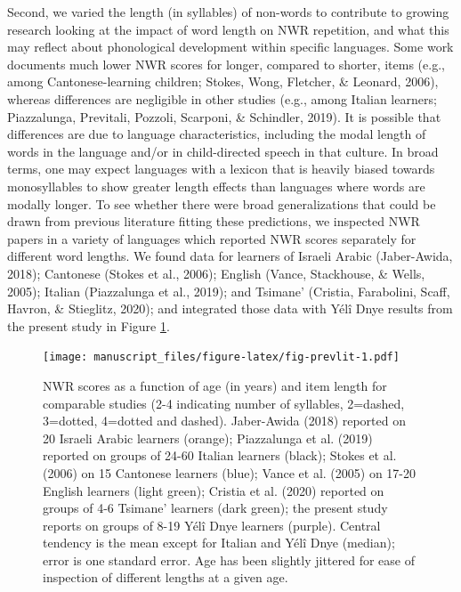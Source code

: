 \documentclass[english,,man,floatsintext]{apa6}
\begin{document}
Second, we varied the length (in syllables) of non-words to contribute to growing research looking at the impact of word length on NWR repetition, and what this may reflect about phonological development within specific languages. Some work documents much lower NWR scores for longer, compared to shorter, items (e.g., among Cantonese-learning children; Stokes, Wong, Fletcher, \& Leonard, 2006), whereas differences are negligible in other studies (e.g., among Italian learners; Piazzalunga, Previtali, Pozzoli, Scarponi, \& Schindler, 2019). It is possible that differences are due to language characteristics, including the modal length of words in the language and/or in child-directed speech in that culture. In broad terms, one may expect languages with a lexicon that is heavily biased towards monosyllables to show greater length effects than languages where words are modally longer. To see whether there were broad generalizations that could be drawn from previous literature fitting these predictions, we inspected NWR papers in a variety of languages which reported NWR scores separately for different word lengths. We found data for learners of Israeli Arabic (Jaber-Awida, 2018); Cantonese (Stokes et al., 2006); English (Vance, Stackhouse, \& Wells, 2005); Italian (Piazzalunga et al., 2019); and Tsimane' (Cristia, Farabolini, Scaff, Havron, \& Stieglitz, 2020); and integrated those data with Yélî Dnye results from the present study in Figure \ref{fig:fig-prevlit}.

\begin{figure}
\centering
\texttt{[image: manuscript\_files/figure-latex/fig-prevlit-1.pdf]}
\caption{\label{fig:fig-prevlit}NWR scores as a function of age (in years) and item length for comparable studies (2-4 indicating number of syllables, 2=dashed, 3=dotted, 4=dotted and dashed). Jaber-Awida (2018) reported on 20 Israeli Arabic learners (orange); Piazzalunga et al. (2019) reported on groups of 24-60 Italian learners (black); Stokes et al. (2006) on 15 Cantonese learners (blue); Vance et al. (2005) on 17-20 English learners (light green); Cristia et al. (2020) reported on groups of 4-6 Tsimane' learners (dark green); the present study reports on groups of 8-19 Yélî Dnye learners (purple). Central tendency is the mean except for Italian and Yélî Dnye (median); error is one standard error. Age has been slightly jittered for ease of inspection of different lengths at a given age.}
\end{figure}
\end{document}
